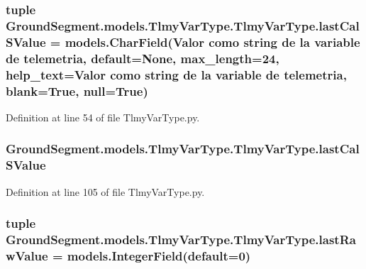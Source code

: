 \subsubsection[{last\+Cal\+S\+Value}]{\setlength{\rightskip}{0pt plus 5cm}tuple Ground\+Segment.\+models.\+Tlmy\+Var\+Type.\+Tlmy\+Var\+Type.\+last\+Cal\+S\+Value = models.\+Char\+Field(\textquotesingle{}Valor como string de la variable de telemetria\textquotesingle{}, default=None, max\+\_\+length=24, help\+\_\+text=\textquotesingle{}Valor como string de la variable de telemetria\textquotesingle{}, blank=True, null=True)\hspace{0.3cm}{\ttfamily [static]}}\label{class_ground_segment_1_1models_1_1_tlmy_var_type_1_1_tlmy_var_type_a29c38267c43d1309cef9066ac601d1e0}


Definition at line 54 of file Tlmy\+Var\+Type.\+py.

\hypertarget{class_ground_segment_1_1models_1_1_tlmy_var_type_1_1_tlmy_var_type_ad9cbf2bf14489a1a6c2908eb67076ca4}{}
\subsubsection[{last\+Cal\+S\+Value}]{\setlength{\rightskip}{0pt plus 5cm}Ground\+Segment.\+models.\+Tlmy\+Var\+Type.\+Tlmy\+Var\+Type.\+last\+Cal\+S\+Value}\label{class_ground_segment_1_1models_1_1_tlmy_var_type_1_1_tlmy_var_type_ad9cbf2bf14489a1a6c2908eb67076ca4}


Definition at line 105 of file Tlmy\+Var\+Type.\+py.

\hypertarget{class_ground_segment_1_1models_1_1_tlmy_var_type_1_1_tlmy_var_type_a224d87e5ebbf0736a428fbde2276db10}{}
\subsubsection[{last\+Raw\+Value}]{\setlength{\rightskip}{0pt plus 5cm}tuple Ground\+Segment.\+models.\+Tlmy\+Var\+Type.\+Tlmy\+Var\+Type.\+last\+Raw\+Value = models.\+Integer\+Field(default=0)\hspace{0.3cm}{\ttfamily [static]}}\label{class_ground_segment_1_1models_1_1_tlmy_var_type_1_1_tlmy_var_type_a224d87e5ebbf0736a428fbde2276db10}


